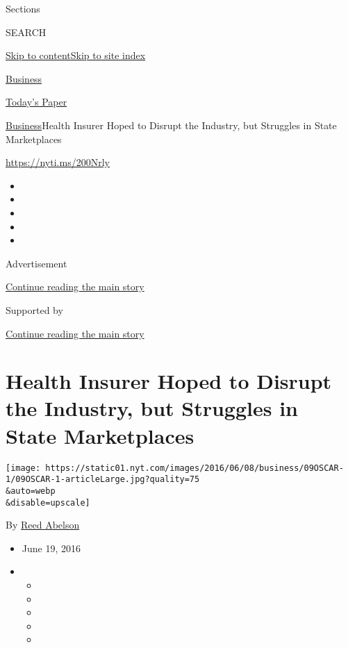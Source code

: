 Sections

SEARCH

\protect\hyperlink{site-content}{Skip to
content}\protect\hyperlink{site-index}{Skip to site index}

\href{https://www.nytimes.com/section/business}{Business}

\href{https://myaccount.nytimes.com/auth/login?response_type=cookie\&client_id=vi}{}

\href{https://www.nytimes.com/section/todayspaper}{Today's Paper}

\href{/section/business}{Business}\textbar{}Health Insurer Hoped to
Disrupt the Industry, but Struggles in State Marketplaces

\url{https://nyti.ms/200Nrly}

\begin{itemize}
\item
\item
\item
\item
\item
\end{itemize}

Advertisement

\protect\hyperlink{after-top}{Continue reading the main story}

Supported by

\protect\hyperlink{after-sponsor}{Continue reading the main story}

\hypertarget{health-insurer-hoped-to-disrupt-the-industry-but-struggles-in-state-marketplaces}{%
\section{Health Insurer Hoped to Disrupt the Industry, but Struggles in
State
Marketplaces}\label{health-insurer-hoped-to-disrupt-the-industry-but-struggles-in-state-marketplaces}}

\texttt{[image: https://static01.nyt.com/images/2016/06/08/business/09OSCAR-1/09OSCAR-1-articleLarge.jpg?quality=75\\\&auto=webp\\\&disable=upscale]}

By \href{http://www.nytimes.com/by/reed-abelson}{Reed Abelson}

\begin{itemize}
\item
  June 19, 2016
\item
  \begin{itemize}
  \item
  \item
  \item
  \item
  \item
  \end{itemize}
\end{itemize}

